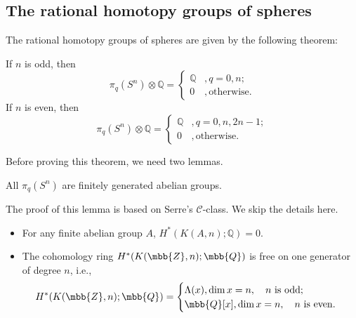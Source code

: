     \subsection{The rational homotopy groups of spheres}
    The rational homotopy groups of spheres are given by the following theorem:
    \begin{theorem}
        If $n$ is odd, then
        \begin{equation*}
            \pi_q(S^n)\otimes\mathbb{Q} =
            \begin{cases}
                \mathbb{Q} &, q=0, n; \\
                0 &, \text{otherwise}.
            \end{cases}
        \end{equation*}
        If $n$ is even, then
        \begin{equation*}
            \pi_q(S^n)\otimes\mathbb{Q} =
            \begin{cases}
                \mathbb{Q} &, q=0, n, 2n-1; \\
                0 &, \text{otherwise}.
            \end{cases}
        \end{equation*}
    \end{theorem} 
    Before proving this theorem, we need two lemmas. 
    \begin{lemma}
        All $\pi_q(S^n)$ are finitely generated abelian groups.
    \end{lemma}
    The proof of this lemma is based on Serre's 
    $\mathscr{C}$-class. We skip the details here. 
    \begin{lemma}\label{coho-of-EMspace}\hfill
        \begin{itemize}
            \item For any finite abelian group $A$, $H^*(K(A,n);\mathbb{Q})=0$.
            \item The cohomology ring $H^*(K(\mbb{Z},n);\mbb{Q})$ is free on one 
            generator of degree $n$, i.e., 
            \begin{equation*}
                H^*(K(\mbb{Z},n);\mbb{Q}) =
                \begin{cases}
                    \Lambda(x), \dim x=n,\quad n \rm{\ is\ odd }; \\
                    \mbb{Q}[x], \dim x=n,\quad n \rm{\ is\ even }.
                \end{cases}
            \end{equation*}
        \end{itemize}
    \end{lemma}
